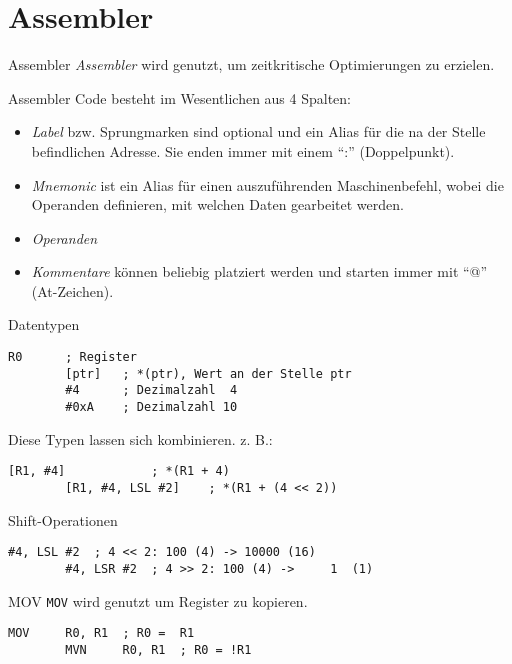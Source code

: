 \section{Assembler}

\begin{defi}{Assembler}
    \emph{Assembler} wird genutzt, um zeitkritische Optimierungen zu erzielen.

    Assembler Code besteht im Wesentlichen aus 4 Spalten:
    \begin{itemize}
        \item \emph{Label} bzw. Sprungmarken sind optional und ein Alias für die na der Stelle befindlichen Adresse.
              Sie enden immer mit einem \enquote{:}  (Doppelpunkt).
        \item \emph{Mnemonic} ist ein Alias für einen auszuführenden Maschinenbefehl, wobei die Operanden definieren, mit welchen Daten gearbeitet werden.
        \item \emph{Operanden}
        \item \emph{Kommentare} können beliebig platziert werden und starten immer mit \enquote{@} (At-Zeichen).
    \end{itemize}
\end{defi}

\begin{defi}{Datentypen}
    \begin{lstlisting}[language={[x86masm]Assembler}]
        R0      ; Register
        [ptr]   ; *(ptr), Wert an der Stelle ptr
        #4      ; Dezimalzahl  4
        #0xA    ; Dezimalzahl 10
    \end{lstlisting}

    Diese Typen lassen sich kombinieren.
    z. B.:
    \begin{lstlisting}[language={[x86masm]Assembler}]
        [R1, #4]            ; *(R1 + 4)
        [R1, #4, LSL #2]    ; *(R1 + (4 << 2))
    \end{lstlisting}
\end{defi}

\begin{defi}{Shift-Operationen}
    \begin{lstlisting}[language={[x86masm]Assembler}]
        #4, LSL #2  ; 4 << 2: 100 (4) -> 10000 (16)
        #4, LSR #2  ; 4 >> 2: 100 (4) ->     1  (1)
    \end{lstlisting}
\end{defi}

\begin{defi}{MOV}
    \texttt{MOV} wird genutzt um Register zu kopieren.

    \begin{lstlisting}[language={[x86masm]Assembler}]
        MOV     R0, R1  ; R0 =  R1
        MVN     R0, R1  ; R0 = !R1
    \end{lstlisting}
\end{defi}

